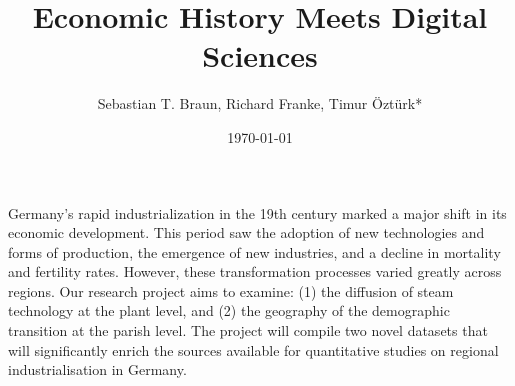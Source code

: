 \documentclass[25pt,a0paper, portrait, colspace = 0.5cm, blockverticalspace = 5mm]{tikzposter}
\title{\textbf{Economic History Meets Digital Sciences}}
\author{Sebastian T. Braun, Richard Franke, Timur Öztürk*}
\date{\today}
\institute{University of Bayreuth}
\begin{document}
\maketitle[titlegraphictotitledistance=-1.5cm,titletoblockverticalspace=0.5cm]


{
Germany's rapid industrialization in the 19th century marked a major shift in its economic development. This period saw the adoption of new technologies and forms of production, the emergence of new industries, and a decline in mortality and fertility rates. However, these transformation processes varied greatly across regions. Our research project aims to examine: (1) the diffusion of steam technology at the plant level, and (2) the geography of the demographic transition at the parish level. The project will compile two novel datasets that will significantly enrich the sources available for quantitative studies on regional industrialisation in Germany.
}


\end{document}
